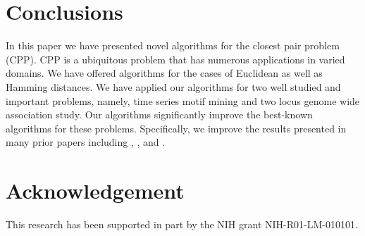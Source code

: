 \documentclass{article}
\theoremstyle{definition}
\theoremstyle{remark}
\begin{document}
\section{Conclusions}\label{sec7}
In this paper we have presented novel algorithms for the closest pair problem (CPP). CPP is a ubiquitous problem that has numerous applications in varied domains. We have offered algorithms for the cases of Euclidean as well as Hamming distances. We have applied our algorithms for two well studied and important problems, namely, time series motif mining and two locus genome wide association study. Our algorithms significantly improve the best-known algorithms for these problems. Specifically, we improve the results presented in many prior papers including \cite{AEQSB09}, \cite{BES03}, and  \cite{PBK11}.

\section{Acknowledgement}
This research has been supported in part by the NIH grant NIH-R01-LM-010101.
\end{document}
